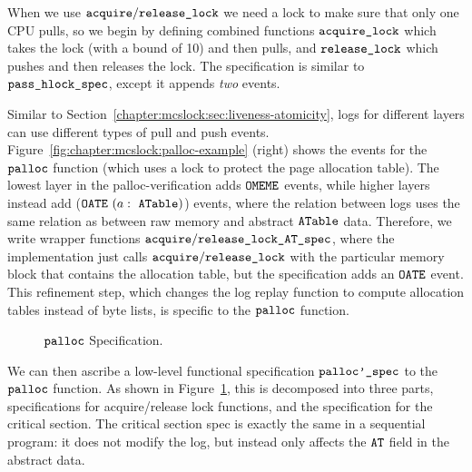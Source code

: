 When we use ${\mathrm{\texttt{acquire}}}/{\mathrm{\texttt{release\_lock}}}$ we
need a lock to make sure that only one CPU pulls, so we begin
by defining combined functions ${\mathrm{\texttt{acquire\_lock}}}$ which
takes the lock (with a bound of 10) and then pulls, and
${\mathrm{\texttt{release\_lock}}}$ which pushes and then releases the
lock. The specification is similar to ${\mathrm{\texttt{pass\_hlock\_spec}}}$,
except it appends \emph{two} events.

Similar to Section~\ref{chapter:mcslock:sec:liveness-atomicity}, logs for different
layers can use different types of pull and push events.
Figure~\ref{fig:chapter:mcslock:palloc-example} (right) shows the events for the
${\mathrm{\texttt{palloc}}}$ function (which uses a lock to protect the page
allocation table). The lowest layer in the palloc-verification adds
${\mathrm{\texttt{OMEME}}}$ events, while higher layers instead add
(${\mathrm{\texttt{OATE}}}~{(a:\ {\mathrm{\texttt{ATable}}})}$) events, where the relation between logs
uses the same relation as between raw memory and abstract
${\mathrm{\texttt{ATable}}}$ data. Therefore, we write wrapper functions
${\mathrm{\texttt{acquire}}}/{\mathrm{\texttt{release\_lock\_AT\_spec}}}$, where the
implementation just calls ${\mathrm{\texttt{acquire}}}/{\mathrm{\texttt{release\_lock}}}$
with the particular memory block that contains the allocation table,
but the specification adds an ${\mathrm{\texttt{OATE}}}$ event.
This refinement step, which changes the log replay function to compute
allocation tables instead of byte lists, is
specific to the ${\mathrm{\texttt{palloc}}}$ function.

\begin{figure}




\caption{${\mathrm{\texttt{palloc}}}$ Specification.}
\label{fig:chapter:mcslock:palloc-spec}
\end{figure}

We can then ascribe a low-level functional specification
${\mathrm{\texttt{palloc'\_spec}}}$ to the ${\mathrm{\texttt{palloc}}}$ function. As shown
in Figure~\ref{fig:chapter:mcslock:palloc-spec}, this is decomposed into three parts, specifications for
acquire/release lock functions, and the specification for the critical
section. The critical section spec is exactly the same in a sequential
program: it does not modify the log, but instead only affects the ${\mathrm{\texttt{AT}}}$ field in the abstract data.


